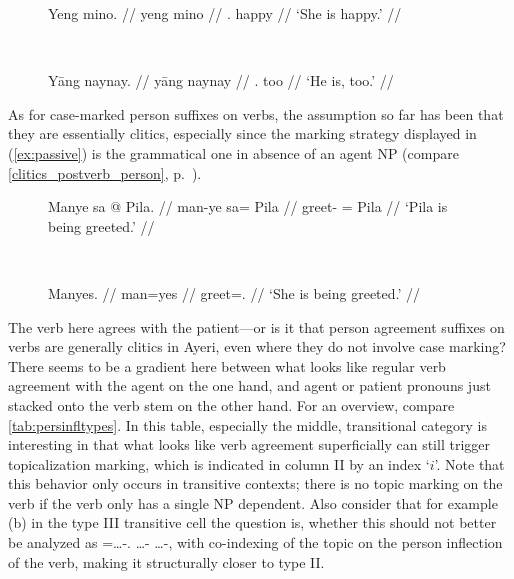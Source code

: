 \begin{figure}[h]
\ex{}\label{ex:indeppro} %
\begin{minipage}[t]{.5\remaining}
\tl\quad\begingl
	\gla Yeng mino. //
	\glb yeng mino //
	\glc \TsgF{}.\Aarg{} happy //
	\glft `She is happy.' //
\endgl
\end{minipage}
~
\begin{minipage}[t]{.5\remaining}
\tl\quad\begingl
	\gla Yāng naynay. //
	\glb yāng naynay //
	\glc \TsgM{}.\Aarg{} too //
	\glft `He is, too.' //
\endgl
\end{minipage}
\xe
\end{figure}

\label{patagr} As for case-marked person suffixes on verbs, the
assumption so far has been that they are essentially clitics, especially since
the marking strategy displayed in (\ref{ex:passive}) is the grammatical one in
absence of an agent NP (compare \autoref{clitics_postverb_person},
p.~\pageref{clitics_postverb_person}).

\begin{figure}[h]
\ex{}\label{ex:passive} %
\begin{minipage}[t]{.5\remaining}
\tl\quad\label{ex:manye}\begingl
	\gla Manye sa @ Pila. //
	\glb man-ye sa= ​Pila //
	\glc greet-\TsgF{} \Parg{}= ​Pila //
	\glft `Pila is being greeted.' //
\endgl
\end{minipage}
~
\begin{minipage}[t]{.5\remaining}
\tl\quad\label{ex:manyes}\begingl
	\gla Manyes. //
	\glb man=yes //
	\glc greet=\TsgF{}.\Parg{} //
	\glft `She is being greeted.' //
\endgl
\end{minipage}
\xe
\end{figure}

The verb here agrees with the patient---or is it that person agreement suffixes
on verbs are generally clitics in Ayeri, even where they do not involve case
marking? There seems to be a gradient here between what looks like regular verb
agreement with the agent on the one hand, and agent or patient pronouns just
stacked onto the verb stem on the other hand. For an overview, compare
\autoref{tab:persinfltypes}. In this table, especially the middle,
transitional category is interesting in that what looks like verb agreement
superficially can still trigger topicalization marking, which is indicated in
column II by an index `$i$'. Note that this behavior only occurs in transitive
contexts; there is no topic marking on the verb if the verb only has a single
NP dependent. Also consider that for example (b) in the type III transitive
cell the question is, whether this should not better be analyzed as
\AgtT{}=…-\TsgM{}.\Top{} …-\Top{} …-\Parg{}, with co-indexing of the topic on 
the person inflection of the verb, making it structurally closer to type II.

